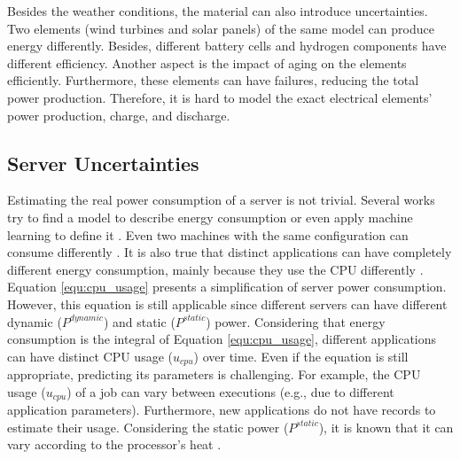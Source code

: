 Besides the weather conditions, the material can also introduce uncertainties. Two elements (wind turbines and solar panels) of the same model can produce energy differently. Besides, different battery cells and hydrogen components have different efficiency. Another aspect is the impact of aging on the elements efficiently. Furthermore, these elements can have failures, reducing the total power production. Therefore, it is hard to model the exact electrical elements' power production, charge, and discharge. 


\subsection{Server Uncertainties}
Estimating the real power consumption of a server is not trivial. Several works try to find a model to describe energy consumption or even apply machine learning to define it \cite{dayarathna2015data}. Even two machines with the same configuration can consume differently \cite{orgerie2010demystifying}. It is also true that distinct applications can have completely different energy consumption, mainly because they use the CPU differently \cite{orgerie2010demystifying, jay2023experimental}. Equation \ref{equ:cpu_usage} presents a simplification of server power consumption. However, this equation is still applicable since different servers can have different dynamic ($P^{dynamic}$) and static ($P^{static}$) power. Considering that energy consumption is the integral of Equation \ref{equ:cpu_usage}, different applications can have distinct CPU usage ($u_{cpu}$) over time. Even if the equation is still appropriate, predicting its parameters is challenging. For example, the CPU usage ($u_{cpu}$) of a job can vary between executions (e.g., due to different application parameters). Furthermore, new applications do not have records to estimate their usage. Considering the static power ($P^{static}$), it is known that it can vary according to the processor's heat \cite{patterson2008effect}.

